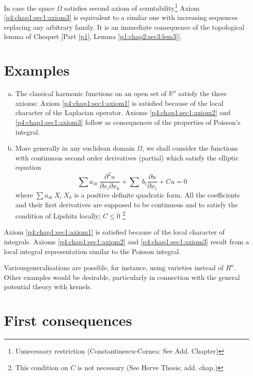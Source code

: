 In case the space $\Omega$ satisfies second axiom of
countability\footnote{Unnecessary restriction
  (Constantinescu-Cornea: See Add. Chapter)} Axiom
\ref{p4:chap1:sec1:axiom3} is 
equivalent to a similar one with increasing sequences replacing any
arbitrary family. It is an immediate consequence of the topological
lemma of Choquet [Part \ref{p1}, Lemma \ref{p1:chap2:sec3:lem3}]. 

\section{Examples}\label{p4:chap1:sec2}%

\begin{enumerate}[(a)]
\item The classical harmonic functions on an open set of
  $\mathbb{R}^n$ satisfy the three axioms: Axiom
  \ref{p4:chap1:sec1:axiom1} is satisfied 
  because of the local character of the Laplacian operator. Axioms
  \ref{p4:chap1:sec1:axiom2} and \ref{p4:chap1:sec1:axiom3} follow as
  consequences of the properties of 
  Poisson's integral. 

\item More generally in any euclidean domain $\Omega$, we shall
  consider the functions with continuous second order derivatives
  (partial) which satisfy the elliptic equation 
  $$
  \sum a_{ik} ~ \frac{\partial^2 u }{\partial x_i \partial x_k} + \sum
  ~ b_i \frac{\partial u}{\partial x_i} + Cu = 0 
  $$
  where $\sum a_{ik} ~ X_i ~ X_k$ is a positive definite quadratic
  form. All the coefficients and their first derivatives are supposed
  to be continuous and to satisfy the condition of Lipshitz locally;
  $C \le 0$ \footnote{This condition on $C$ is not necessary
    (See Herve Thesis; add. chap.)} 
\end{enumerate}


Axiom \ref{p4:chap1:sec1:axiom1} is satisfied because of the local character of
integrals. Axioms \ref{p4:chap1:sec1:axiom2} and
\ref{p4:chap1:sec1:axiom3} result from a local integral 
representation similar to the Poisson integral. 

Various\pageoriginale generalisations are possible, for instance,
using varieties 
instead of $R^n$. Other examples would be desirable, particularly in
connection with the general potential theory with kernels. 

\section{First consequences}\label{p4:chap1:sec3}%

